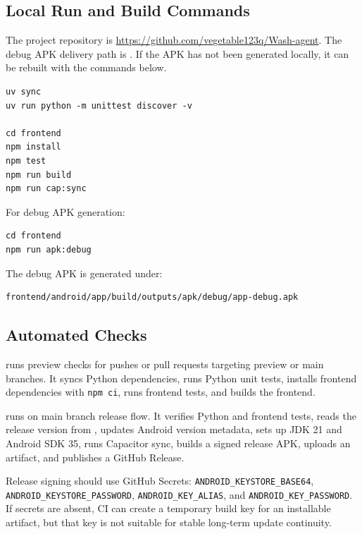 \documentclass[11pt,a4paper]{article}
\begin{document}
\subsection{Local Run and Build Commands}

The project repository is \url{https://github.com/vegetable123q/Wash-agent}. The debug APK delivery path is . If the APK has not been generated locally, it can be rebuilt with the commands below.

\begin{lstlisting}[style=command]
uv sync
uv run python -m unittest discover -v

cd frontend
npm install
npm test
npm run build
npm run cap:sync
\end{lstlisting}

For debug APK generation:

\begin{lstlisting}[style=command]
cd frontend
npm run apk:debug
\end{lstlisting}

The debug APK is generated under:

\begin{lstlisting}[style=command]
frontend/android/app/build/outputs/apk/debug/app-debug.apk
\end{lstlisting}

\subsection{Automated Checks}

 runs preview checks for pushes or pull requests targeting preview or main branches. It syncs Python dependencies, runs Python unit tests, installs frontend dependencies with \texttt{npm ci}, runs frontend tests, and builds the frontend.

 runs on main branch release flow. It verifies Python and frontend tests, reads the release version from , updates Android version metadata, sets up JDK 21 and Android SDK 35, runs Capacitor sync, builds a signed release APK, uploads an artifact, and publishes a GitHub Release.

Release signing should use GitHub Secrets: \texttt{ANDROID\_KEYSTORE\_BASE64}, \texttt{ANDROID\_KEYSTORE\_PASSWORD}, \texttt{ANDROID\_KEY\_ALIAS}, and \texttt{ANDROID\_KEY\_PASSWORD}. If secrets are absent, CI can create a temporary build key for an installable artifact, but that key is not suitable for stable long-term update continuity.
\end{document}
